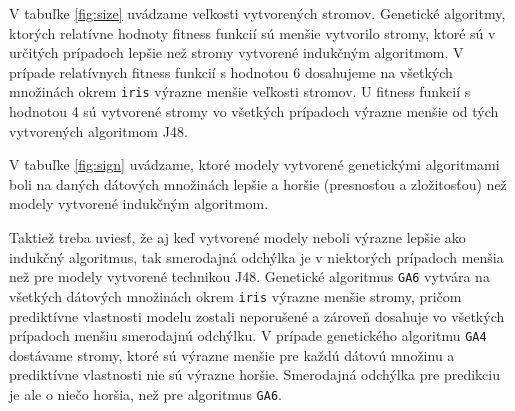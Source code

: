 V tabuľke \ref{fig:size} uvádzame veľkosti vytvorených stromov. Genetické algoritmy, ktorých relatívne hodnoty fitness funkcií sú menšie vytvorilo stromy, ktoré sú v určitých prípadoch lepšie než stromy vytvorené indukčným algoritmom. V prípade relatívnych fitness funkcií s hodnotou 6 dosahujeme na všetkých množinách okrem \verb|iris| výrazne menšie veľkosti stromov. U fitness funkcií s hodnotou 4 sú vytvorené stromy vo všetkých prípadoch výrazne menšie od tých vytvorených algoritmom J48. 

V tabuľke \ref{fig:sign} uvádzame, ktoré modely vytvorené genetickými algoritmami boli na daných dátových množinách lepšie a horšie (presnosťou a zložitosťou) než modely vytvorené indukčným algoritmom.

Taktiež treba uviesť, že aj keď vytvorené modely neboli výrazne lepšie ako indukčný algoritmus, tak smerodajná odchýlka je v niektorých prípadoch menšia než pre modely vytvorené technikou J48.
Genetické algoritmus \verb|GA6| vytvára na všetkých dátových množinách okrem \verb|iris| výrazne menšie stromy, pričom prediktívne vlastnosti modelu zostali neporušené a zároveň dosahuje vo všetkých prípadoch menšiu smerodajnú odchýlku. V prípade genetického algoritmu \verb|GA4| dostávame stromy, ktoré sú výrazne menšie pre každú dátovú množinu a prediktívne vlastnosti nie sú výrazne horšie. Smerodajná odchýlka pre predikciu je ale o niečo horšia, než pre algoritmus \verb|GA6|.

